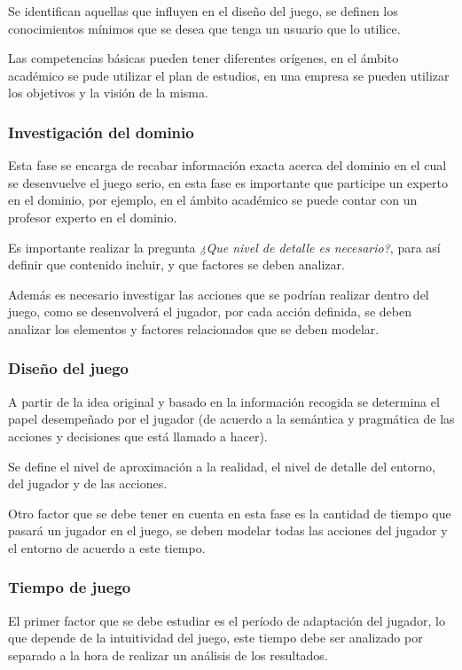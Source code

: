 Se identifican aquellas que influyen en el diseño del juego, se definen los
conocimientos mínimos que se desea que tenga un usuario que lo utilice.

Las competencias básicas pueden tener diferentes orígenes, en el ámbito
académico se pude utilizar el plan de estudios, en una empresa se pueden
utilizar los objetivos y la visión de la misma.

\subsubsection{Investigación del dominio}

Esta fase se encarga de recabar información exacta acerca del dominio en el cual
se desenvuelve el juego serio, en esta fase es importante que participe un
experto en el dominio, por ejemplo, en el ámbito académico se puede contar con
un profesor experto en el dominio.

Es importante realizar la pregunta \emph{¿Que nivel de detalle es necesario?},
para así definir que contenido incluir, y que factores se deben analizar.

Además es necesario investigar las acciones que se podrían realizar dentro del
juego, como se desenvolverá el jugador, por cada acción definida, se deben
analizar los elementos y factores relacionados que se deben modelar.

\subsubsection{Diseño del juego}

A partir de la idea original y basado en la información recogida se determina el
papel desempeñado por el jugador (de acuerdo a la semántica y pragmática de las
acciones y decisiones que está llamado a hacer). 

Se define el nivel de aproximación a la realidad, el nivel de detalle del
entorno, del jugador y de las acciones.

Otro factor que se debe tener en cuenta en esta fase es la cantidad de tiempo
que pasará un jugador en el juego, se deben modelar todas las acciones del
jugador y el entorno de acuerdo a este tiempo.

\subsubsection{Tiempo de juego}

El primer factor que se debe estudiar es el período de adaptación del jugador,
lo que depende de la intuitividad del juego, este tiempo debe ser analizado por
separado a la hora de realizar un análisis de los resultados.

